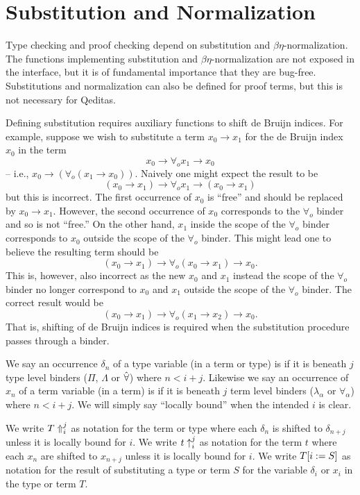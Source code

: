 \section{Substitution and Normalization}

Type checking and proof checking depend on substitution and $\beta\eta$-normalization.
The functions implementing substitution and $\beta\eta$-normalization are not exposed in the
interface, but it is of fundamental importance that they are bug-free.
Substitutions and normalization can also be defined for proof terms,
but this is not necessary for Qeditas.

Defining substitution requires auxiliary functions to shift
de Bruijn indices.
For example, suppose we wish to substitute a term
$x_0\to x_1$ for the de Bruijn index $x_0$ in the term
$$x_0\to\forall_o x_1\to x_0$$
-- i.e., $x_0\to (\forall_o (x_1\to x_0))$.
Naively one might expect the result to be
$$(x_0\to x_1)\to\forall_o x_1\to (x_0 \to x_1)$$
but this is incorrect.
The first occurrence of $x_0$ is ``free'' and should be replaced
by $x_0\to x_1$.
However, the second occurrence of $x_0$ corresponds to the $\forall_o$ binder
and so is not ``free.'' On the other hand, $x_1$ inside the scope of the $\forall_o$ binder
corresponds to $x_0$ outside the scope of the $\forall_o$ binder.
This might lead one to believe the resulting term should be
$$(x_0\to x_1)\to\forall_o (x_0\to x_1)\to x_0.$$
This is, however, also incorrect as the new $x_0$ and $x_1$ instead the scope of the $\forall_o$ binder
no longer correspond to $x_0$ and $x_1$ outside the scope of the $\forall_o$ binder.
The correct result would be
$$(x_0\to x_1)\to\forall_o (x_1\to x_2)\to x_0.$$
That is, shifting of de Bruijn indices is required when the substitution procedure
passes through a binder.

We say an occurrence $\delta_n$ of a type variable (in a term or type) is {}
if it is beneath $j$ type level binders ($\Pi$, $\Lambda$ or $\tforall$) where $n < i+j$.
Likewise we say an occurrence of $x_n$ of a term variable (in a term) is {}
if it is beneath $j$ term level binders ($\lambda_\alpha$ or $\forall_\alpha$) where $n < i+j$.
We will simply say ``locally bound'' when the intended $i$ is clear.

We write $\dbtpsh{i}{j}{T}$ as notation for the term or type 
where each $\delta_n$ is shifted to $\delta_{n+j}$ unless it is locally bound for $i$.
We write $\dbsh{i}{j}{t}$ as notation for the term $t$
where each $x_n$ are shifted to $x_{n+j}$ unless it is locally bound for $i$.
We write $\dbsub{i}{S}{T}$ as notation for the result of substituting a
type or term $S$ for the variable $\delta_i$ or $x_i$ in the type or term $T$.

